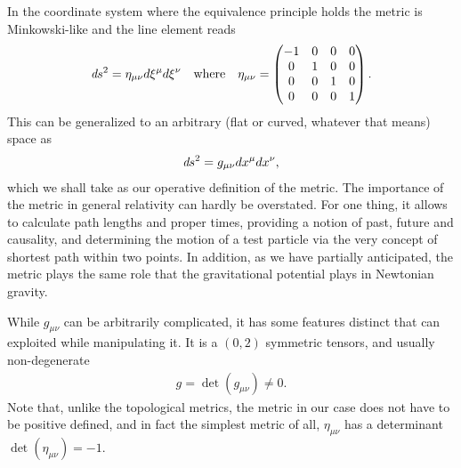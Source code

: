In the coordinate system where the equivalence principle holds the metric is
Minkowski-like and the line element reads
\begin{align*}
  \emph{d}s^2 = \eta_{\mu\nu} d\xi^\mu d\xi^\nu
  \quad\text{where}\quad
  \eta_{\mu\nu} =
  \begin{pmatrix}
  -1 & 0 & 0 & 0\\
  0 & 1 & 0 & 0\\
  0 & 0 & 1 & 0\\
  0 & 0 & 0 & 1\\
  \end{pmatrix}.
\end{align*}
This can be generalized to an arbitrary (flat or curved, whatever that means) space
as
\begin{align}
  \emph{d}s^2 = g_{\mu\nu} dx^\mu dx^\nu,
\end{align}
which we shall take as our operative definition of the metric. The importance of
the metric in general relativity can hardly be overstated. For one thing, it allows
to calculate path lengths and proper times, providing a notion of past, future and
causality, and determining the motion of a test particle via the very concept of
shortest path within two points. In addition, as we have partially anticipated,
the metric plays the same role that the gravitational potential plays in Newtonian
gravity.

While $g_{\mu\nu}$ can be arbitrarily complicated, it has some features distinct
that can exploited while manipulating it. It is a $(0, 2)$ symmetric tensors, and
usually non-degenerate
\begin{align}
  g = \det(g_{\mu\nu}) \neq 0.
\end{align}
Note that, unlike the topological metrics, the metric in our case does not have to
be positive defined, and in fact the simplest metric of all, $\eta_{\mu\nu}$ has
a determinant $\det(\eta_{\mu\nu}) = -1$.

